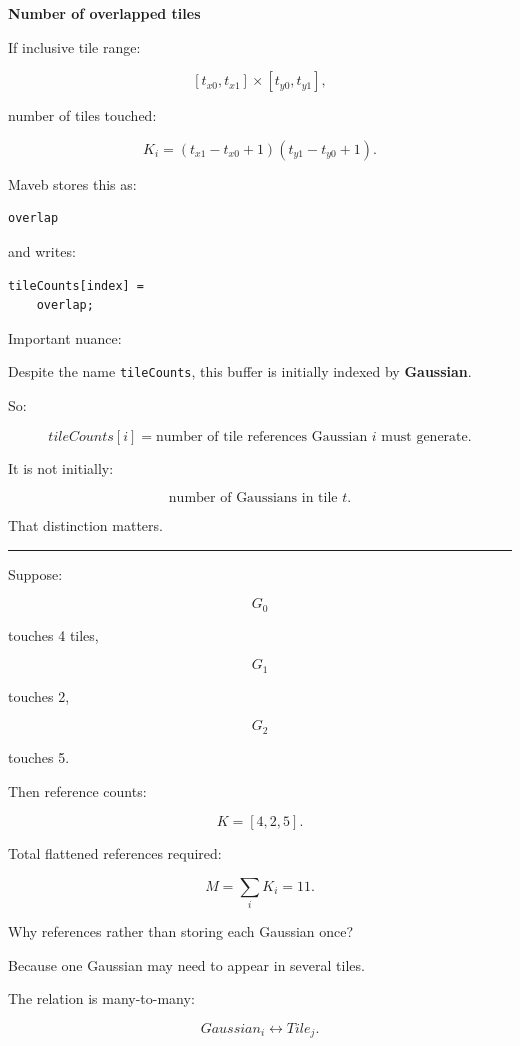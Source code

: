\textbf{Number of overlapped tiles}

If inclusive tile range:

\[
[t_{x0},t_{x1}]
\times
[t_{y0},t_{y1}],
\]

number of tiles touched:

\[
\boxed{
K_i
=
(t_{x1}-t_{x0}+1)
(t_{y1}-t_{y0}+1).
}
\]

Maveb stores this as:

\begin{verbatim}
overlap
\end{verbatim}

and writes:

\begin{verbatim}
tileCounts[index] =
    overlap;
\end{verbatim}

Important nuance:

Despite the name \texttt{tileCounts}, this buffer is initially indexed by \textbf{Gaussian}.

So:

\[
tileCounts[i]
=
\text{number of tile references Gaussian }i\text{ must generate}.
\]

It is not initially:

\[
\text{number of Gaussians in tile }t.
\]

That distinction matters.

\begin{center}\rule{0.5\linewidth}{0.5pt}\end{center}

Suppose:

\[
G_0
\]

touches 4 tiles,

\[
G_1
\]

touches 2,

\[
G_2
\]

touches 5.

Then reference counts:

\[
K=
[4,2,5].
\]

Total flattened references required:

\[
\boxed{
M=
\sum_i K_i
=
11.
}
\]

Why references rather than storing each Gaussian once?

Because one Gaussian may need to appear in several tiles.

The relation is many-to-many:

\[
Gaussian_i
\leftrightarrow
Tile_j.
\]

